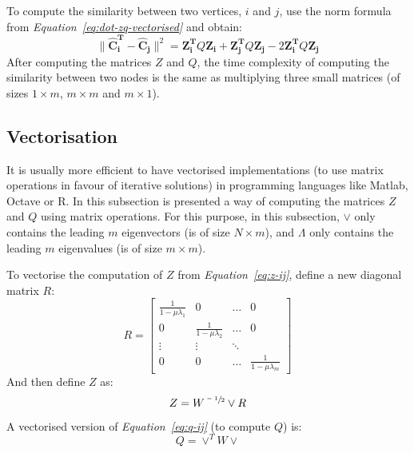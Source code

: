 \documentclass[12pt]{report}
\begin{document}
To compute the similarity between two vertices, $i$ and $j$, use the norm formula
from \emph{Equation~\ref{eq:dot-zq-vectorised}} and obtain:
%
\begin{equation}
\|\mathbf{\hat{C}_i^T} - \mathbf{\hat{C}_j}\|^2 = \mathbf{Z_i^T} Q \mathbf{Z_i} + \mathbf{Z_j^T} Q \mathbf{Z_j} - 2 \mathbf{Z_i^T} Q \mathbf{Z_j}
\end{equation}
%
After computing the matrices $Z$ and $Q$, the time complexity of computing the
similarity between two nodes is the same as multiplying three small matrices
(of sizes $1 \times m$, $m \times m$ and $m \times 1$).


\subsection*{Vectorisation}
It is usually more efficient to have vectorised implementations (to use matrix
operations in favour of iterative solutions) in programming languages like Matlab,
Octave or R. In this subsection is presented a way of computing the matrices $Z$
and $Q$ using matrix operations. For this purpose, in this subsection, $\vee$ only
contains the leading $m$ eigenvectors (is of size $N \times m$), and $\Lambda$ only
contains the leading $m$ eigenvalues (is of size $m \times m$).


%
%
To vectorise the computation of $Z$ from \emph{Equation~\ref{eq:z-ij}}, define a
new diagonal matrix $R$:
%
\begin{equation}
R = \begin{bmatrix}
\frac{1}{1 - \mu \lambda_1} & 0  & \dots & 0 \\
0 & \frac{1}{1 - \mu \lambda_2}  & \dots & 0 \\
\vdots & \vdots & \ddots & \\
0 & 0 & \dots & \frac{1}{1 - \mu \lambda_m}
\end{bmatrix}
\end{equation}
And then define $Z$ as:
\begin{equation}
Z = W^{\sfrac{-1}{2}} \vee R
\end{equation}
%
%
A vectorised version of \emph{Equation~\ref{eq:q-ij}} (to compute $Q$) is:
\begin{equation}
Q = \vee^T W \vee
\end{equation}


%
\end{document}
